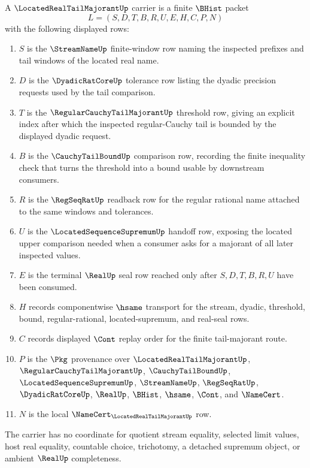 \begin{definition}
\label{def:located-real-tail-majorant-carrier}
A $\LocatedRealTailMajorantUp$ carrier is a finite $\BHist$ packet
$$
L=(S,D,T,B,R,U,E,H,C,P,N)
$$
with the following displayed rows:
\begin{enumerate}
\item $S$ is the $\StreamNameUp$ finite-window row naming the inspected prefixes and tail windows of the located real name.
\item $D$ is the $\DyadicRatCoreUp$ tolerance row listing the dyadic precision requests used by the tail comparison.
\item $T$ is the $\RegularCauchyTailMajorantUp$ threshold row, giving an explicit index after which the inspected regular-Cauchy tail is bounded by the displayed dyadic request.
\item $B$ is the $\CauchyTailBoundUp$ comparison row, recording the finite inequality check that turns the threshold into a bound usable by downstream consumers.
\item $R$ is the $\RegSeqRatUp$ readback row for the regular rational name attached to the same windows and tolerances.
\item $U$ is the $\LocatedSequenceSupremumUp$ handoff row, exposing the located upper comparison needed when a consumer asks for a majorant of all later inspected values.
\item $E$ is the terminal $\RealUp$ seal row reached only after $S,D,T,B,R,U$ have been consumed.
\item $H$ records componentwise $\hsame$ transport for the stream, dyadic, threshold, bound, regular-rational, located-supremum, and real-seal rows.
\item $C$ records displayed $\Cont$ replay order for the finite tail-majorant route.
\item $P$ is the $\Pkg$ provenance over $\LocatedRealTailMajorantUp$, $\RegularCauchyTailMajorantUp$, $\CauchyTailBoundUp$, $\LocatedSequenceSupremumUp$, $\StreamNameUp$, $\RegSeqRatUp$, $\DyadicRatCoreUp$, $\RealUp$, $\BHist$, $\hsame$, $\Cont$, and $\NameCert$.
\item $N$ is the local $\NameCert_{\LocatedRealTailMajorantUp}$ row.
\end{enumerate}
The carrier has no coordinate for quotient stream equality, selected limit values, host real equality, countable choice, trichotomy, a detached supremum object, or ambient $\RealUp$ completeness.
\end{definition}

